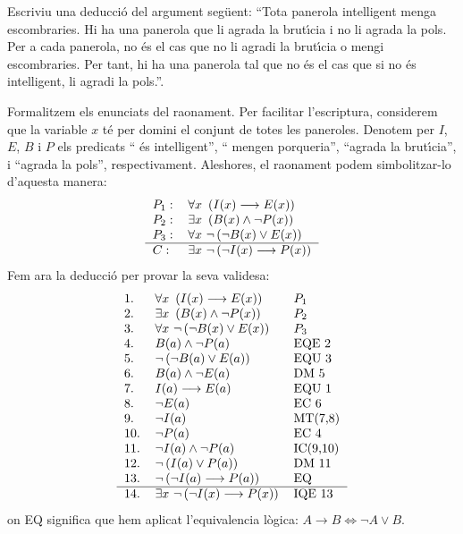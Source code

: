 \begin{exercici}
Escriviu una deducci\'{o} del argument seg\"{u}ent: \textquotedblleft Tota
panerola intel\textperiodcentered ligent menga escombraries. Hi ha una
panerola que li agrada la brut\'{\i}cia i no li agrada la pols. Per a cada
panerola, no \'{e}s el cas que no li agradi la brut\'{\i}cia o mengi
escombraries. Per tant, hi ha una panerola tal que no \'{e}s el cas que si no
\'{e}s intel\textperiodcentered ligent, li agradi la pols.\textquotedblright.
\end{exercici}

\begin{solucio}
Formalitzem els enunciats del raonament. Per facilitar l'escriptura,
considerem que la variable $x$ t\'{e} per domini el conjunt de totes les
paneroles. Denotem per $I$, $E$, $B$ i $P$ els predicats \textquotedblleft%
\'{e}s intel\textperiodcentered ligent\textquotedblright, \textquotedblleft
mengen porqueria\textquotedblright, \textquotedblleft agrada la
brut\'{\i}cia\textquotedblright, i \textquotedblleft agrada la
pols\textquotedblright, respectivament. Aleshores, el raonament podem
simbolitzar-lo d'aquesta manera:%
\[%
\begin{tabular}
[c]{ll}%
$P_{1}:$ & $\forall x~\left(  I(x)\longrightarrow E(x)\right)  $\\
$P_{2}:$ & $\exists x~\left(  B(x)\wedge\lnot P(x)\right)  $\\
$P_{3}:$ & $\forall x~\lnot\left(  \lnot B(x)\vee E(x)\right)  $\\\hline
$C:$ & $\exists x~\lnot\left(  \lnot I(x)\longrightarrow P(x)\right)  $%
\end{tabular}
\]
Fem ara la deducci\'{o} per provar la seva validesa:%
\[%
\begin{tabular}
[c]{lll}%
1. & $\forall x~\left(  I(x)\longrightarrow E(x)\right)  $ & $P_{1}$\\
2. & $\exists x~\left(  B(x)\wedge\lnot P(x)\right)  $ & $P_{2}$\\
3. & $\forall x~\lnot\left(  \lnot B(x)\vee E(x)\right)  $ & $P_{3}$\\
4. & $B(a)\wedge\lnot P(a)$ & EQE 2\\
5. & $\lnot\left(  \lnot B(a)\vee E(a)\right)  $ & EQU 3\\
6. & $B(a)\wedge\lnot E(a)$ & DM 5\\
7. & $I(a)\longrightarrow E(a)$ & EQU 1\\
8. & $\lnot E(a)$ & EC 6\\
9. & $\lnot I(a)$ & MT(7,8)\\
10. & $\lnot P(a)$ & EC 4\\
11. & $\lnot I(a)\wedge\lnot P(a)$ & IC(9,10)\\
12. & $\lnot\left(  I(a)\vee P(a)\right)  $ & DM 11\\
13. & $\lnot\left(  \lnot I(a)\longrightarrow P(a)\right)  $ & EQ\\\hline
14. & $\exists x~\lnot\left(  \lnot I(x)\longrightarrow P(x)\right)  $ & IQE
13
\end{tabular}
\]
on EQ significa que hem aplicat l'equivalencia l\`{o}gica: $A\longrightarrow
B\Longleftrightarrow\lnot A\vee B$.
\end{solucio}

